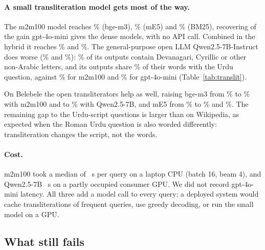 \paragraph{A small transliteration model gets most of the way.} The m2m100 model reaches \% (bge-m3), \% (mE5) and \% (BM25), recovering \MtwoMShare{} of the gain gpt-4o-mini gives the dense models, with no API call. Combined in the hybrid it reaches \% and \%. The general-purpose open LLM Qwen2.5-7B-Instruct does worse (\% and \%): \% of its outputs contain Devanagari, Cyrillic or other non-Arabic letters, and its outputs share \% of their words with the Urdu question, against \% for m2m100 and \% for gpt-4o-mini (Table~\ref{tab:translit}).

On Belebele the open transliterators help as well, raising bge-m3 from \% to \% with m2m100 and to \% with Qwen2.5-7B, and mE5 from \% to \% and \%. The remaining gap to the Urdu-script questions is larger than on Wikipedia, as expected when the Roman Urdu question is also worded differently: transliteration changes the script, not the words.

\paragraph{Cost.} m2m100 took a median of ~s per query on a laptop CPU (batch 16, beam 4), and Qwen2.5-7B ~s on a partly occupied consumer GPU. We did not record gpt-4o-mini latency. All three add a model call to every query; a deployed system would cache transliterations of frequent queries, use greedy decoding, or run the small model on a GPU.

\subsection{What still fails}

